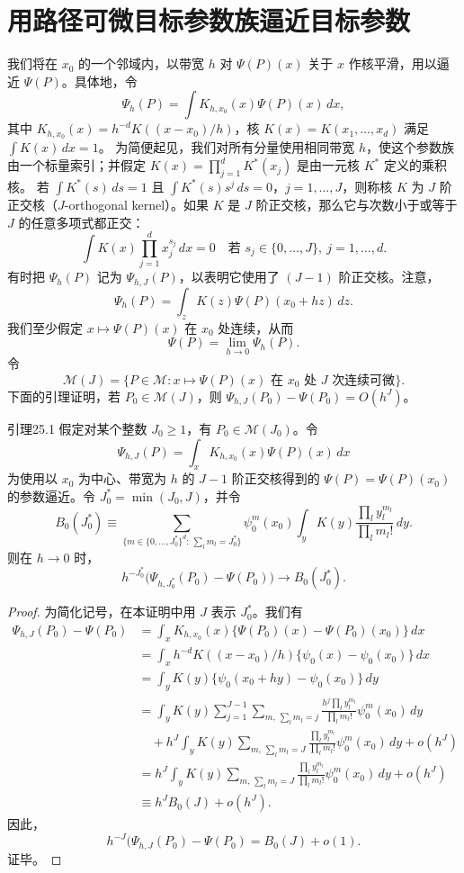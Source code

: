 \section{用路径可微目标参数族逼近目标参数}

我们将在 $x_0$ 的一个邻域内，以带宽 $h$ 对 $\Psi(P)(x)$ 关于 $x$ 作核平滑，用以逼近 $\Psi(P)$。具体地，令
\[
 \Psi_h(P)=\int K_{h,x_0}(x)\Psi(P)(x)\,dx,
\]
其中 $K_{h,x_0}(x)=h^{-d}K((x-x_0)/h)$，核
$K(x)=K(x_1,\ldots,x_d)$ 满足 $\int K(x)\,dx=1$。
为简便起见，我们对所有分量使用相同带宽 $h$，使这个参数族由一个标量索引；并假定
$K(x)=\prod_{j=1}^{d}K^*(x_j)$ 是由一元核 $K^*$ 定义的乘积核。
若 $\int K^*(s)\,ds=1$ 且
$\int K^*(s)s^j\,ds=0$，$j=1,\ldots,J$，则称核 $K$ 为 $J$ 阶正交核（$J$-orthogonal kernel）。如果 $K$ 是 $J$ 阶正交核，那么它与次数小于或等于 $J$ 的任意多项式都正交：
\[
 \int K(x)\prod_{j=1}^{d}x_j^{s_j}\,dx=0
 \quad\text{若 }s_j\in\{0,\ldots,J\},\ j=1,\ldots,d.
\]
有时把 $\Psi_h(P)$ 记为 $\Psi_{h,J}(P)$，以表明它使用了 $(J-1)$ 阶正交核。注意，
\[
 \Psi_h(P)=\int_z K(z)\Psi(P)(x_0+hz)\,dz.
\]
我们至少假定 $x\mapsto\Psi(P)(x)$ 在 $x_0$ 处连续，从而
\[
 \Psi(P)=\lim_{h\to0}\Psi_h(P).
\]
令
\[
 \mathcal M(J)=
 \{P\in\mathcal M:x\mapsto\Psi(P)(x)\text{ 在 }x_0\text{ 处 }J\text{ 次连续可微}\}.
\]
下面的引理证明，若 $P_0\in\mathcal M(J)$，则
$\Psi_{h,J}(P_0)-\Psi(P_0)=O(h^J)$。

\begin{bookresult}{引理}{25.1}
假定对某个整数 $J_0\geq1$，有 $P_0\in\mathcal M(J_0)$。令
\[
 \Psi_{h,J}(P)=\int_x K_{h,x_0}(x)\Psi(P)(x)\,dx
\]
为使用以 $x_0$ 为中心、带宽为 $h$ 的 $J-1$ 阶正交核得到的
$\Psi(P)=\Psi(P)(x_0)$ 的参数逼近。令 $J_0^*=\min(J_0,J)$，并令
\[
 B_0(J_0^*)\equiv
 \sum_{\{m\in\{0,\ldots,J_0^*\}^d:\,\sum_lm_l=J_0^*\}}
 \psi_0^m(x_0)\int_y K(y)
 \frac{\prod_l y_l^{m_l}}{\prod_l m_l!}\,dy.
\]
则在 $h\to0$ 时，
\[
 h^{-J_0^*}\bigl(\Psi_{h,J_0^*}(P_0)-\Psi(P_0)\bigr)
 \longrightarrow B_0(J_0^*).
\]
\end{bookresult}

\begin{proof}
为简化记号，在本证明中用 $J$ 表示 $J_0^*$。我们有
\[
\begin{aligned}
 \Psi_{h,J}(P_0)-\Psi(P_0)
 &=\int_x K_{h,x_0}(x)
   \{\Psi(P_0)(x)-\Psi(P_0)(x_0)\}\,dx\\
 &=\int_x h^{-d}K((x-x_0)/h)
   \{\psi_0(x)-\psi_0(x_0)\}\,dx\\
 &=\int_y K(y)\{\psi_0(x_0+hy)-\psi_0(x_0)\}\,dy\\
 &=\int_y K(y)\sum_{j=1}^{J-1}
   \sum_{m,\,\sum_lm_l=j}
   \frac{h^j\prod_l y_l^{m_l}}{\prod_lm_l!}\psi_0^m(x_0)\,dy\\
 &\quad+h^J\int_y K(y)\sum_{m,\,\sum_lm_l=J}
   \frac{\prod_l y_l^{m_l}}{\prod_lm_l!}\psi_0^m(x_0)\,dy+o(h^J)\\
 &=h^J\int_y K(y)\sum_{m,\,\sum_lm_l=J}
   \frac{\prod_l y_l^{m_l}}{\prod_lm_l!}\psi_0^m(x_0)\,dy+o(h^J)\\
 &\equiv h^JB_0(J)+o(h^J).
\end{aligned}
\]
因此，
\[
 h^{-J}(\Psi_{h,J}(P_0)-\Psi(P_0)=B_0(J)+o(1).
\]
证毕。
\end{proof}


